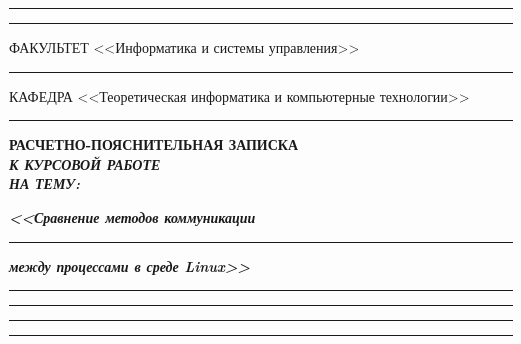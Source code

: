 \documentclass[14pt, russian]{scrartcl}
\begin{document}
\begin{titlepage}
	\vspace{-2pt}
	\hspace{-34.5pt}\rule{\textwidth}{2.5pt}

	\vspace*{-20.3pt}
	\hspace{-34.5pt}\rule{\textwidth}{0.4pt}

	\vspace{0.5ex}
	\noindent \small ФАКУЛЬТЕТ\hspace{80pt} <<Информатика и системы управления>>

	\vspace*{-16pt}
	\hspace{35pt}\rule{0.855\textwidth}{0.4pt}

	\vspace{0.5ex}
	\noindent \small КАФЕДРА\hspace{50pt} <<Теоретическая информатика и компьютерные технологии>>

	\vspace*{-16pt}
	\hspace{25pt}\rule{0.875\textwidth}{0.4pt}


	\vspace{3em}

	\begin{center}
		\Large \bf{РАСЧЕТНО-ПОЯСНИТЕЛЬНАЯ ЗАПИСКА\\\textbf{\textit{К КУРСОВОЙ РАБОТЕ\\НА ТЕМУ:}} \\}
	\end{center}

	\vspace*{-6ex}
	\begin{center}
		\Large{\textit{\textbf{<<Сравнение методов коммуникации }}}

		\vspace*{-3ex}
		\rule{0.9\textwidth}{1.2pt}

		\vspace*{-0.2ex}
		\Large{\textit{\textbf{между процессами в среде Linux>>}}}
		\vspace*{-3ex}
		\vspace*{-0.2ex}
		\rule{0.9\textwidth}{1.2pt}

		\vspace*{-0.2ex}
		\rule{0.9\textwidth}{1.2pt}

		\vspace*{-0.2ex}
		\rule{0.9\textwidth}{1.2pt}

		\vspace*{-0.2ex}
		\rule{0.9\textwidth}{1.2pt}
	\end{center}


\end{titlepage}
\end{document}
